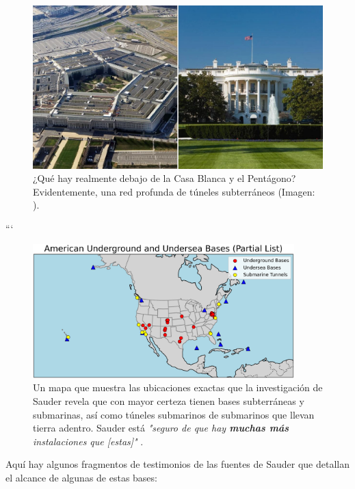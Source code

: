\documentclass[10pt,twocolumn,letterpaper]{article}
\begin{document}
\begin{figure}[b]
\begin{center}
   \includegraphics[width=1\linewidth]{penta.jpg}
\end{center}
   \caption{¿Qué hay realmente debajo de la Casa Blanca y el Pentágono? Evidentemente, una red profunda de túneles subterráneos (Imagen: \cite{31}).}
\label{fig:3}
\label{fig:onecol}
\end{figure}
```
\begin{figure}[t]
\begin{center}
\includegraphics[width=0.9\textwidth]{basescrop.png}
\end{center}
   \caption{Un mapa que muestra las ubicaciones exactas que la investigación de Sauder revela que con mayor certeza tienen bases subterráneas y submarinas, así como túneles submarinos de submarinos que llevan tierra adentro. Sauder está \textit{"seguro de que hay \textbf{muchas más} instalaciones que [estas]"} \cite{22}.}
   \label{fig:4}
\end{figure}

Aquí hay algunos fragmentos de testimonios de las fuentes de Sauder que detallan el alcance de algunas de estas bases:
\end{document}
